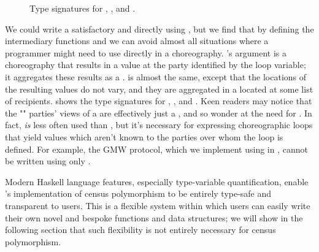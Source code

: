 \begin{figure*}[tbhp]
  \begin{mdframed}
    \inputminted[xleftmargin=10pt,linenos,fontsize=\scriptsize]{haskell}{figures/census-poly-haskell.hs.txt}
    \caption{
        Type signatures for , , and .
    }
    \label{fig:census-poly-haskell}
  \end{mdframed}
\end{figure*}

We could write a satisfactory  and  directly using ,
but we find that by defining the intermediary functions  and 
we can avoid almost all situations where a programmer might need to use  directly in a choreography.
's argument is a choreography that results in a  value at the party identified by the loop variable;
it aggregates these results as a .
 is almost the same, except that the locations of the resulting values do not vary,
and they are aggregated in a  located at some list of recipients.
 shows the type signatures for , , and .
Keen readers may notice that the "" parties' views of a  are effectively just a ,
and so wonder at the need for .
In fact,  \emph{is} less often used than ,
but it's necessary for expressing choreographic loops that yield values which aren't known to the parties over whom the loop is defined.
For example, the GMW protocol, which we implement using \MultiChor in , cannot be written using only .

Modern Haskell language features, especially type-variable quantification,
enable \MultiChor's implementation of census polymorphism to be entirely type-safe and transparent to users.
This is a flexible system within which users can easily write their own novel and bespoke functions and data structures;
we will show in the following section that such flexibility is not entirely necessary for census polymorphism.


